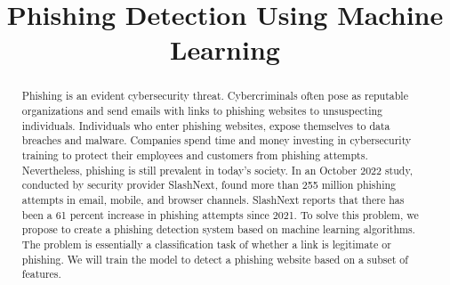 \documentclass[conference]{IEEEtran}
\begin{document}
\title{Phishing Detection Using Machine Learning}

\author{
\and
{}
\and
{}
}

\maketitle


\begin{abstract}
Phishing is an evident cybersecurity threat. Cybercriminals often pose as reputable organizations and send emails with links to phishing websites to unsuspecting individuals. Individuals who enter phishing websites, expose themselves to data breaches and malware. Companies spend time and money investing in cybersecurity training to protect their employees and customers from phishing attempts. Nevertheless, phishing is still prevalent in today’s society. In an October 2022 study, conducted by security provider SlashNext, found more than 255 million phishing attempts in email, mobile, and browser channels. SlashNext reports that there has been a 61 percent increase in phishing attempts since 2021. To solve this problem, we propose to create a phishing detection system based on machine learning algorithms. The problem is essentially a classification task of whether a link is legitimate or phishing. We will train the model to detect a phishing website based on a subset of features. 
\end{abstract}
\end{document}
